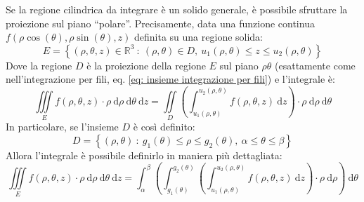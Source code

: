 \documentclass[a4paper]{article}
\newcommand{\dquotes}[1]{``#1''}
\begin{document}
	\noindent
	Se la regione cilindrica da integrare è un solido generale, è possibile sfruttare la proiezione sul piano \dquotes{polare}. Precisamente, data una funzione continua $f\left(\rho\cos\left(\theta\right),\rho\sin\left(\theta\right),z\right)$ definita su una regione solida:
	\begin{equation}
		E = \left\{\left(\rho, \theta, z\right) \in \mathbb{R}^{3} \: : \: \left(\rho, \theta\right) \in D,\: u_{1}\left(\rho, \theta\right) \le z \le u_{2}\left(\rho,\theta\right)\right\}
	\end{equation}
	Dove la regione $D$ è la proiezione della regione $E$ sul piano $\rho\theta$ (esattamente come nell'integrazione per fili, eq. \ref{eq: insieme integrazione per fili}) e l'integrale è:
	\begin{equation}
		\displaystyle\iiint\limits_{E} f\left(\rho,\theta,z\right) \cdot \rho \:\mathrm{d}\rho\:\mathrm{d}\theta\:\mathrm{d}z
		=
		\displaystyle\iint\limits_{D} \left(\int_{u_{1}\left(\rho, \theta\right)}^{u_{2}\left(\rho, \theta\right)} f\left(\rho,\theta,z\right) \:\mathrm{d}z \right) \cdot\rho \:\mathrm{d}\rho\:\mathrm{d}\theta
	\end{equation}
	In particolare, se l'insieme $D$ è così definito:
	\begin{equation}
		D = \left\{\left(\rho, \theta\right) \: : \: g_{1}\left(\theta\right) \le \rho \le g_{2}\left(\theta\right), \: \alpha \le \theta \le \beta\right\}
	\end{equation}
	Allora l'integrale è possibile definirlo in maniera più dettagliata:
	\begin{equation}
		\displaystyle\iiint\limits_{E} f\left(\rho,\theta,z\right) \cdot \rho \:\mathrm{d}\rho\:\mathrm{d}\theta\:\mathrm{d}z
		=
		\displaystyle \int_{\alpha}^{\beta} \left(\int_{g_{1}\left(\theta\right)}^{g_{2}\left(\theta\right)} \left(\int_{u_{1}\left(\rho, \theta\right)}^{u_{2}\left(\rho, \theta\right)} f\left(\rho,\theta,z\right) \:\mathrm{d}z \right) \cdot\rho \:\mathrm{d}\rho \right) \:\mathrm{d}\theta
	\end{equation}\newpage
\end{document}
